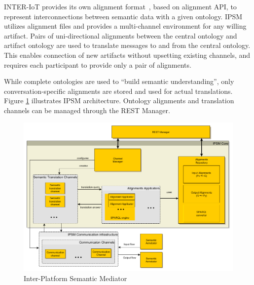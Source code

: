 \documentclass{sig-alternate-05-2015}
\begin{document}

INTER-IoT provides its own alignment format~\cite{Pawlowski2017}, based on alignment API, to represent interconnections between semantic data with a given ontology. IPSM utilizes alignment files and provides a multi-channel environment for any willing artifact. Pairs of uni-directional alignments between the central ontology and artifact ontology are used to translate messages to and from the central ontology. This enables connection of new artifacts without upsetting existing channels, and requires each participant to provide only a pair of alignments.

While complete ontologies are used to “build semantic understanding”, only conversation-specific alignments are stored and used for actual translations. Figure \ref{fig:IPSM} illustrates IPSM architecture. Ontology alignments and translation channels can be managed through the REST Manager.




\begin{figure}[h!]
\centering
\includegraphics[scale=0.22]{IPSM}
\caption{Inter-Platform Semantic Mediator}
\label{fig:IPSM}
\end{figure}
\end{document}
